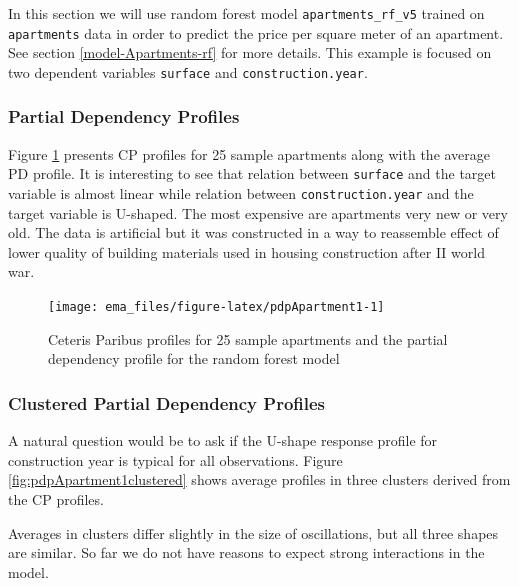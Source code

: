 \documentclass[12pt,]{krantz}
\begin{document}
In this section we will use random forest model \texttt{apartments\_rf\_v5} trained on \texttt{apartments} data in order to predict the price per square meter of an apartment. See section \ref{model-Apartments-rf} for more details.
This example is focused on two dependent variables \texttt{surface} and \texttt{construction.year}.

\hypertarget{partial-dependency-profiles-1}{%
\subsubsection{Partial Dependency Profiles}\label{partial-dependency-profiles-1}}

Figure \ref{fig:pdpApartment1} presents CP profiles for 25 sample apartments along with the average PD profile.
It is interesting to see that relation between \texttt{surface} and the target variable is almost linear while relation between \texttt{construction.year} and the target variable is U-shaped. The most expensive are apartments very new or very old. The data is artificial but it was constructed in a way to reassemble effect of lower quality of building materials used in housing construction after II world war.

\begin{figure}

{\centering \texttt{[image: ema\_files/figure-latex/pdpApartment1-1]} 

}

\caption{Ceteris Paribus profiles for 25 sample apartments and the partial dependency profile for the random forest model}\label{fig:pdpApartment1}
\end{figure}

\hypertarget{clustered-partial-dependency-profiles-1}{%
\subsubsection{Clustered Partial Dependency Profiles}\label{clustered-partial-dependency-profiles-1}}

A natural question would be to ask if the U-shape response profile for construction year is typical for all observations. Figure \ref{fig:pdpApartment1clustered} shows average profiles in three clusters derived from the CP profiles.

Averages in clusters differ slightly in the size of oscillations, but all three shapes are similar. So far we do not have reasons to expect strong interactions in the model.
\end{document}
